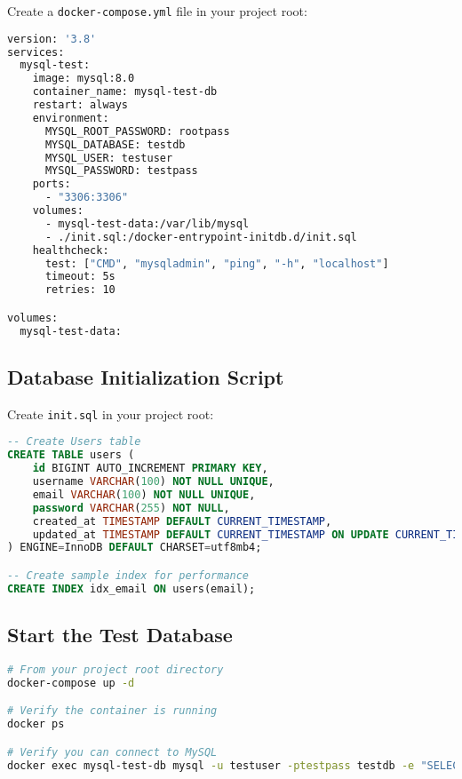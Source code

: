 \documentclass[12pt,a4paper]{article}
\begin{document}
Create a \texttt{docker-compose.yml} file in your project root:

\begin{lstlisting}[language=bash, caption=docker-compose.yml - MySQL Database Setup]
version: '3.8'
services:
  mysql-test:
    image: mysql:8.0
    container_name: mysql-test-db
    restart: always
    environment:
      MYSQL_ROOT_PASSWORD: rootpass
      MYSQL_DATABASE: testdb
      MYSQL_USER: testuser
      MYSQL_PASSWORD: testpass
    ports:
      - "3306:3306"
    volumes:
      - mysql-test-data:/var/lib/mysql
      - ./init.sql:/docker-entrypoint-initdb.d/init.sql
    healthcheck:
      test: ["CMD", "mysqladmin", "ping", "-h", "localhost"]
      timeout: 5s
      retries: 10

volumes:
  mysql-test-data:
\end{lstlisting}

\subsection{Database Initialization Script}

Create \texttt{init.sql} in your project root:

\begin{lstlisting}[language=sql, caption=init.sql - Database Schema]
-- Create Users table
CREATE TABLE users (
    id BIGINT AUTO_INCREMENT PRIMARY KEY,
    username VARCHAR(100) NOT NULL UNIQUE,
    email VARCHAR(100) NOT NULL UNIQUE,
    password VARCHAR(255) NOT NULL,
    created_at TIMESTAMP DEFAULT CURRENT_TIMESTAMP,
    updated_at TIMESTAMP DEFAULT CURRENT_TIMESTAMP ON UPDATE CURRENT_TIMESTAMP
) ENGINE=InnoDB DEFAULT CHARSET=utf8mb4;

-- Create sample index for performance
CREATE INDEX idx_email ON users(email);
\end{lstlisting}

\subsection{Start the Test Database}

\begin{lstlisting}[language=bash, caption=Start Docker Compose]
# From your project root directory
docker-compose up -d

# Verify the container is running
docker ps

# Verify you can connect to MySQL
docker exec mysql-test-db mysql -u testuser -ptestpass testdb -e "SELECT 1;"
\end{lstlisting}
\end{document}
